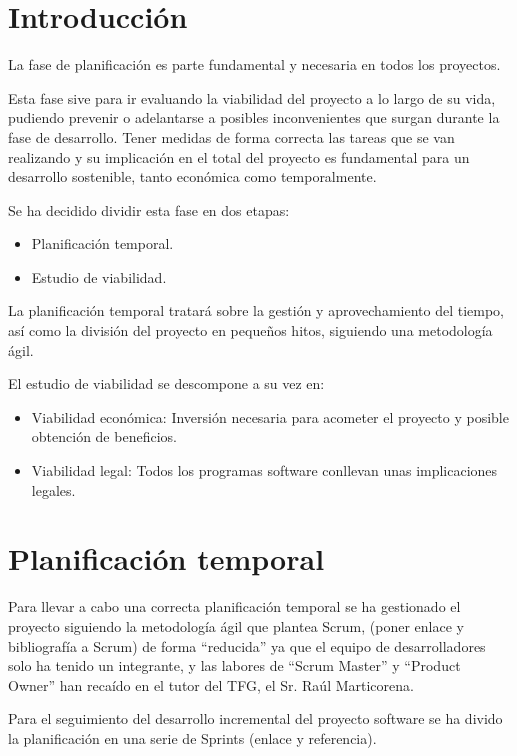 
\section{Introducción}

La fase de planificación es parte fundamental y necesaria en todos los proyectos.

Esta fase sive para ir evaluando la viabilidad del proyecto a lo largo de su vida, pudiendo prevenir o adelantarse a posibles inconvenientes que surgan durante la fase de desarrollo.
Tener medidas de forma correcta las tareas que se van realizando y su implicación en el total del proyecto es fundamental para un desarrollo sostenible, tanto económica como temporalmente.

Se ha decidido dividir esta fase en dos etapas:

\begin{itemize}
	\item
	Planificación temporal.
	\item
	Estudio de viabilidad.
\end{itemize}

La planificación temporal tratará sobre la gestión y aprovechamiento del tiempo, así como la división del proyecto en pequeños hitos, siguiendo una metodología ágil.

El estudio de viabilidad se descompone a su vez en:

\begin{itemize}
	\item
	Viabilidad económica: Inversión necesaria para acometer el proyecto y posible obtención de beneficios.
	\item
	Viabilidad legal: Todos los programas software conllevan unas implicaciones legales.
\end{itemize}
\clearpage
\section{Planificación temporal}

Para llevar a cabo una correcta planificación temporal se ha gestionado el proyecto siguiendo la metodología ágil que plantea Scrum, (poner enlace y bibliografía a Scrum) de forma ``reducida'' ya que el equipo de desarrolladores solo ha tenido un integrante, y las labores de ``Scrum Master'' y ``Product Owner'' han recaído en el tutor del TFG, el Sr. Raúl Marticorena.

Para el seguimiento del desarrollo incremental del proyecto software se ha divido la planificación en una serie de Sprints (enlace y referencia).

